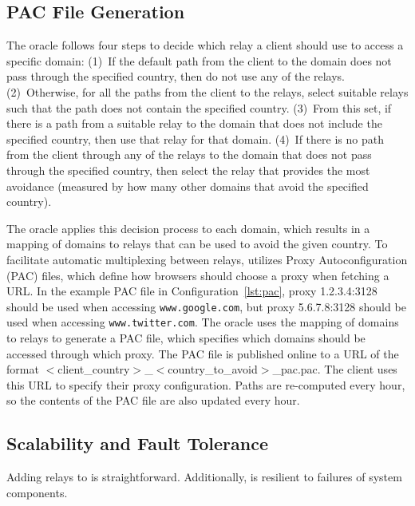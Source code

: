 \subsection{PAC File Generation}
\label{multiplex}
The oracle follows four steps to decide which relay a client should
use to access a specific domain: (1)~If the default path from the
client to the domain does not pass through the specified country, then
do not use any of the relays.  (2)~Otherwise, for all the paths from
the client to the relays, select suitable relays such that the path
does not contain the specified country.  (3)~From this set, if there
is a path from a suitable relay to the domain that does not include
the specified country, then use that relay for that domain.  (4)~If
there is no path from the client through any of the relays to the
domain that does not pass through the specified country, then select
the relay that provides the most avoidance (measured by how many other
domains that avoid the specified country).
\begin{figure}[t]
\renewcommand{\lstlistingname}{Configuration}

\vspace*{-0.25in}
\end{figure}
The oracle applies this decision process to each domain, which results
in a mapping of domains to relays that can be used to avoid the given
country.  To facilitate automatic multiplexing between relays,
\system{} utilizes Proxy Autoconfiguration (PAC) files, which define
how browsers should choose a proxy when fetching a URL.  In the
example PAC file in Configuration~\ref{lst:pac}, proxy 1.2.3.4:3128
should be used when accessing {\tt www.google.com}, but proxy
5.6.7.8:3128 should be used when accessing {\tt www.twitter.com}.  The
oracle uses the mapping of domains to relays to generate a PAC file,
which specifies which domains should be accessed through which proxy.
The PAC file is published online to a URL of the format
$<$client\_country$>$\_$<$country\_to\_avoid$>$\_pac.pac.  The client
uses this URL to specify their proxy configuration.  Paths are
re-computed every hour, so the contents of the PAC file are also
updated every hour.

\subsection{Scalability and Fault Tolerance}
Adding relays to \system{} is 
straightforward. Additionally, \system{} is resilient to failures of system components.

